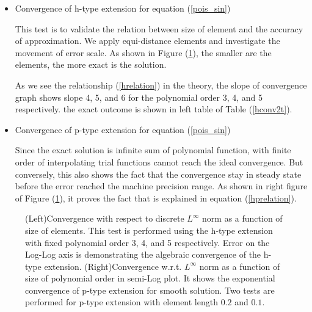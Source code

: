 \begin{itemize}

\item {Convergence of h-type extension for equation (\ref{pois_sin})}

This test is to validate the relation between size of element and the accuracy of approximation. We apply equi-distance elements and investigate the movement of error scale. As shown in Figure (\ref{sinDNconv}), the smaller are the elements, the more exact is the solution.

As we see the relationship (\ref{hrelation}) in the theory, the slope of convergence graph shows slope 4, 5, and 6 for the polynomial order 3, 4, and 5 respectively. the exact outcome is shown in left table of Table (\ref{hconv2t}).

\item {Convergence of p-type extension for equation (\ref{pois_sin})}

Since the exact solution is infinite sum of polynomial function, with finite order of interpolating trial functions cannot reach the ideal convergence. But conversely, this also shows the fact that the convergence stay in steady state before the error reached the machine precision range. As shown in right figure of Figure (\ref{sinDNconv}), it proves the fact that is explained in equation (\ref{hprelation}).

\end{itemize}

\begin{figure}[h]
\begin{center}
\caption{\label{sinDNconv}
(Left)Convergence with respect to discrete $L^{\infty}$ norm as a function of size of elements. This test is performed using the h-type extension with fixed polynomial order 3, 4, and 5 respectively. Error on the Log-Log axis is demonstrating the algebraic convergence of the h-type extension.
(Right)Convergence w.r.t. $L^{\infty}$ norm as a function of size of polynomial order in semi-Log plot. It shows the exponential convergence of p-type extension for smooth solution. Two tests are performed for p-type extension with element length $0.2$ and $0.1$.
}
\end{center}
\end{figure}

